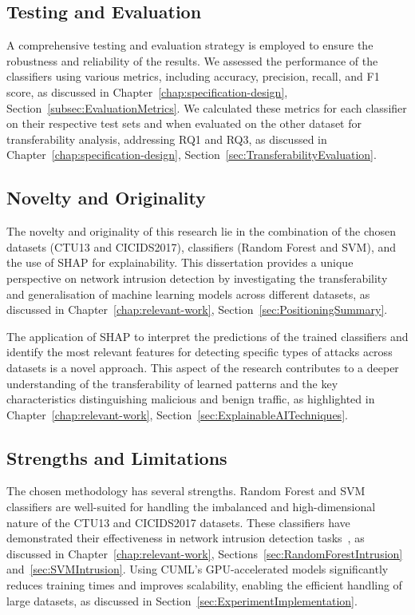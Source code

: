 \subsection{Testing and Evaluation}\label{subsec:testing-evaluation}

A comprehensive testing and evaluation strategy is employed to ensure the robustness and reliability of the results. We assessed the performance of the classifiers using various metrics, including accuracy, precision, recall, and F1 score, as discussed in Chapter~\ref{chap:specification-design}, Section~\ref{subsec:EvaluationMetrics}. We calculated these metrics for each classifier on their respective test sets and when evaluated on the other dataset for transferability analysis, addressing RQ1 and RQ3, as discussed in Chapter~\ref{chap:specification-design}, Section~\ref{sec:TransferabilityEvaluation}.

\subsection{Novelty and Originality}\label{subsec:novelty-originality}

The novelty and originality of this research lie in the combination of the chosen datasets (CTU13 and CICIDS2017), classifiers (Random Forest and SVM), and the use of SHAP for explainability. This dissertation provides a unique perspective on network intrusion detection by investigating the transferability and generalisation of machine learning models across different datasets, as discussed in Chapter~\ref{chap:relevant-work}, Section~\ref{sec:PositioningSummary}.

The application of SHAP to interpret the predictions of the trained classifiers and identify the most relevant features for detecting specific types of attacks across datasets is a novel approach. This aspect of the research contributes to a deeper understanding of the transferability of learned patterns and the key characteristics distinguishing malicious and benign traffic, as highlighted in Chapter~\ref{chap:relevant-work}, Section~\ref{sec:ExplainableAITechniques}.

\subsection{Strengths and Limitations}\label{subsec:strengths-limitations}

The chosen methodology has several strengths. Random Forest and SVM classifiers are well-suited for handling the imbalanced and high-dimensional nature of the CTU13 and CICIDS2017 datasets. These classifiers have demonstrated their effectiveness in network intrusion detection tasks~\cite{farnaaz2016random, teng2017svm}, as discussed in Chapter~\ref{chap:relevant-work}, Sections~\ref{sec:RandomForestIntrusion} and~\ref{sec:SVMIntrusion}. Using CUML's GPU-accelerated models significantly reduces training times and improves scalability, enabling the efficient handling of large datasets, as discussed in Section~\ref{sec:ExperimentImplementation}.


